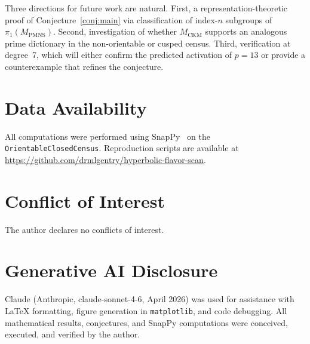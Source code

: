 \documentclass[12pt]{article}
\theoremstyle{definition}
\begin{document}
Three directions for future work are natural. First, a
representation-theoretic proof of Conjecture~\ref{conj:main} via
classification of index-$n$ subgroups of $\pi_1(M_{\mathrm{PMNS}})$.
Second, investigation of whether $M_{\mathrm{CKM}}$ supports an
analogous prime dictionary in the non-orientable or cusped census.
Third, verification at degree~7, which will either confirm the predicted
activation of $p = 13$ or provide a counterexample that refines the
conjecture.

\section*{Data Availability}

All computations were performed using SnapPy~\cite{SnapPy}
on the \texttt{OrientableClosedCensus}. Reproduction scripts are
available at
\url{https://github.com/drmlgentry/hyperbolic-flavor-scan}.

\section*{Conflict of Interest}

The author declares no conflicts of interest.


\section*{Generative AI Disclosure}
Claude (Anthropic, claude-sonnet-4-6, April 2026) was used for
assistance with \LaTeX{} formatting, figure generation in
\texttt{matplotlib}, and code debugging. All mathematical results,
conjectures, and SnapPy computations were conceived, executed, and
verified by the author.
\end{document}
